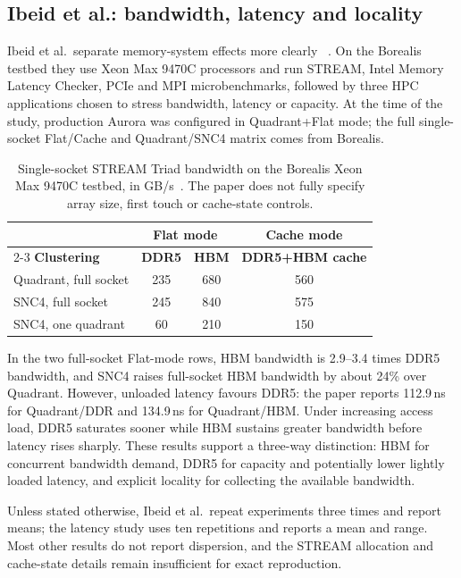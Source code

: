 \subsection{Ibeid et al.: bandwidth, latency and locality}
\label{sec:ibeid-review}

Ibeid et al.\ separate memory-system effects more clearly
~\cite{ibeid2025aurora}.  On the Borealis testbed they use Xeon Max
9470C processors and run STREAM, Intel Memory Latency Checker, PCIe and
MPI microbenchmarks, followed by three HPC applications chosen to stress
bandwidth, latency or capacity.  At the time of the study, production
Aurora was configured in Quadrant+Flat mode; the full single-socket
Flat/Cache and Quadrant/SNC4 matrix comes from Borealis.

\begin{table}[tbp]
\centering
\small
\caption{Single-socket STREAM Triad bandwidth on the Borealis Xeon Max
9470C testbed, in GB/s~\cite{ibeid2025aurora}.  The paper does not fully
specify array size, first touch or cache-state controls.}
\label{tab:ibeid-stream}
\begin{tabular}{@{}lccc@{}}
\toprule
 & \multicolumn{2}{c}{\textbf{Flat mode}} & \textbf{Cache mode} \\
\cmidrule(lr){2-3}
\textbf{Clustering} & \textbf{DDR5} & \textbf{HBM} & \textbf{DDR5+HBM cache} \\
\midrule
Quadrant, full socket & 235 & 680 & 560 \\
SNC4, full socket     & 245 & 840 & 575 \\
SNC4, one quadrant    &  60 & 210 & 150 \\
\bottomrule
\end{tabular}
\end{table}

In the two full-socket Flat-mode rows, HBM bandwidth is 2.9--3.4 times
DDR5 bandwidth, and SNC4 raises full-socket HBM bandwidth by about 24\%
over Quadrant.
However, unloaded latency favours DDR5: the paper reports 112.9\,ns for
Quadrant/DDR and 134.9\,ns for Quadrant/HBM.  Under increasing access
load, DDR5 saturates sooner while HBM sustains greater bandwidth before
latency rises sharply.  These results support a three-way distinction:
HBM for concurrent bandwidth demand, DDR5 for capacity and potentially
lower lightly loaded latency, and explicit locality for collecting the
available bandwidth.

Unless stated otherwise, Ibeid et al.\ repeat experiments three times
and report means; the latency study uses ten repetitions and reports a
mean and range.  Most other results do not report dispersion, and the
STREAM allocation and cache-state details remain insufficient for exact
reproduction.

